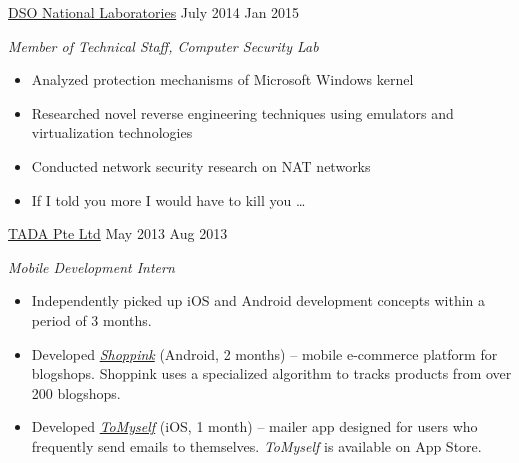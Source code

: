 \documentclass[]{cv} %
\begin{document}
\entry
{\href{https://www.dso.org.sg/}{DSO National Laboratories}}
{July 2014 \to Jan 2015}
{\emph{Member of Technical Staff, Computer Security Lab}
\begin{itemize}[topsep=2.5pt, parsep=1.5pt]
\item Analyzed protection mechanisms of Microsoft Windows kernel
\item Researched novel reverse engineering techniques using emulators and virtualization technologies
\item Conducted network security research on NAT networks
\item If I told you more I would have to kill you \dots
\end{itemize}}
\entry
{\href{http://www.shoppink.me/}{TADA Pte Ltd}}
{May 2013 \to Aug 2013}
{\emph{Mobile Development Intern}
\begin{itemize}[topsep=2.5pt, parsep=1.5pt]
\item Independently picked up iOS and Android development concepts within a period of 3 months.
\item Developed \href{http://www.shoppink.me/}{\emph{Shoppink}} (Android, 2 months) -- mobile e-commerce platform for blogshops. Shoppink uses a specialized algorithm to tracks products from over 200 blogshops.
\item Developed \href{http://www.shoppink.me/tomyself}{\emph{ToMyself}} (iOS, 1 month) -- mailer app designed for users who frequently send emails to themselves. \emph{ToMyself} is available on App Store.
\end{itemize}}
\end{document}

